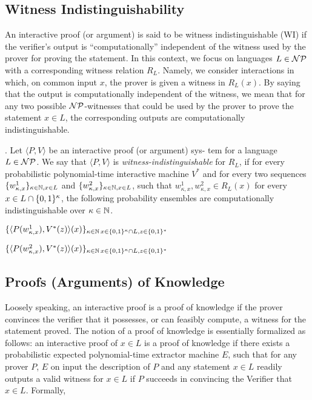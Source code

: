 {\ED

\subsection{Witness Indistinguishability}
An interactive proof (or argument) is said to be witness indistinguishable (WI) if the verifier's
output is ``computationally'' independent of the witness used by the prover for proving the statement.
In this context, we focus on languages $L \in {{\cal NP}}$ with a corresponding witness relation $R_L$.
Namely, we consider interactions in which, on common input $x$, the prover is given a witness in
$R_L(x)$. By saying that the output is computationally independent of the witness, we mean that
for any two possible ${{\cal NP}}$-witnesses that could be used by the prover to prove the statement $x \in L$,
the corresponding outputs are computationally indistinguishable.

. Let $\langle P, V \rangle$ be an interactive proof (or argument) sys-
tem for a language $L \in {{\cal NP}}$. We say that $\langle P, V \rangle$ is \emph{witness-indistinguishable} for $R_L$, if for every
probabilistic polynomial-time interactive machine $V^*$ and for every two sequences $\{w^1_{\kappa,x}\}_{\kappa\in \mathbb{N},x\in L}$ and $\{w^2_{\kappa,x}\}_{\kappa\in \mathbb{N},x\in L}$, such that $w^1_{\kappa,x}, w^2_{\kappa,x}\in R_L(x)$ for every $x \in L\cap \{0,1\}^\kappa$, the following probability
ensembles are computationally indistinguishable over $\kappa\in \mathbb{N}$.
\ED

\BI
\item $\{\langle P(w^1_{\kappa,x}), V^*(z) \rangle(x)\}_{\kappa\in \mathbb{N}\,x\in \{0,1\}^\kappa\cap L, z\in\{0,1\}^*}$
\item $\{\langle P(w^2_{\kappa,x}), V^*(z) \rangle(x)\}_{\kappa\in \mathbb{N}\,x\in \{0,1\}^\kappa\cap L, z\in\{0,1\}^*}$
\EI
\subsection{Proofs (Arguments) of Knowledge}
Loosely speaking, an interactive proof is a proof of knowledge if the prover convinces the verifier
that it possesses, or can feasibly compute, a witness for the statement proved. The notion of a
proof of knowledge is essentially formalized as follows: an interactive proof of $x \in L$ is a proof of
knowledge if there exists a probabilistic expected polynomial-time extractor machine $E$, such that
for any prover $P$, $E$ on input the description of $P$ and any statement $x \in L$ readily outputs a valid
witness for $x \in L$ if $P$ succeeds in convincing the Verifier that $x \in L$. Formally,

}
